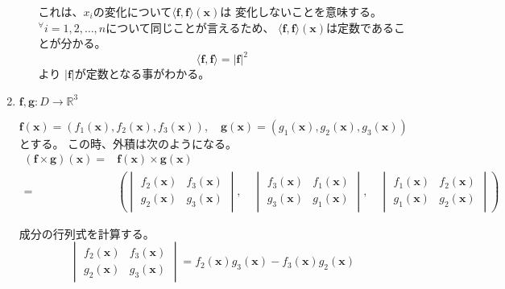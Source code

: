 \documentclass[12pt,b5paper]{ltjsarticle}
\begin{document}
\begin{enumerate}
\begin{enumerate}
            これは、$x_i$の変化について$\langle \bm{f},\bm{f}\rangle (\bm{x})$は
            変化しないことを意味する。
            ${}^{\forall}i=1,2,\dots,n$について同じことが言えるため、
            $\langle \bm{f},\bm{f}\rangle (\bm{x})$は定数であることが分かる。
            \begin{equation}
             \langle \bm{f},\bm{f}\rangle = \lvert \bm{f} \rvert^2
            \end{equation}
            より
            $\lvert \bm{f} \rvert$が定数となる事がわかる。
      \end{enumerate}

\dotfill

 \item
      $\bm{f},\bm{g}:D\rightarrow \mathbb{R}^3$

      \begin{equation}
       \bm{f}(\bm{x})=(f_1(\bm{x}),f_2(\bm{x}),f_3(\bm{x})),
        \quad
        \bm{g}(\bm{x})=(g_1(\bm{x}),g_2(\bm{x}),g_3(\bm{x}))
      \end{equation}
      とする。
      この時、外積は次のようになる。
      \begin{align}
       (\bm{f}\times\bm{g})(\bm{x}) =&
       \bm{f}(\bm{x})\times\bm{g}(\bm{x})\\
       =& \left(
       \begin{vmatrix}f_2(\bm{x})&f_3(\bm{x})\\ g_2(\bm{x})&g_3(\bm{x})\end{vmatrix},
       \quad
       \begin{vmatrix}f_3(\bm{x})&f_1(\bm{x})\\ g_3(\bm{x})&g_1(\bm{x})\end{vmatrix},
       \quad
       \begin{vmatrix}f_1(\bm{x})&f_2(\bm{x})\\ g_1(\bm{x})&g_2(\bm{x})\end{vmatrix}
       \right)\label{compo}
      \end{align}

      成分の行列式を計算する。
      \begin{equation}
        \begin{vmatrix}f_2(\bm{x})&f_3(\bm{x})\\ g_2(\bm{x})&g_3(\bm{x})\end{vmatrix}
        = f_2(\bm{x})g_3(\bm{x}) - f_3(\bm{x})g_2(\bm{x})
      \end{equation}


\end{enumerate}
\end{document}

